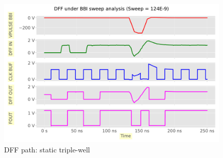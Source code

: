 
\begin{figure}[h]
	\centering
	\includegraphics[width=\columnwidth]{./figures/dff-pdf-tw-neg/anim0114.pdf}
	\caption{DFF path: static triple-well}
	\label{dffstatic-tw}
\end{figure}
